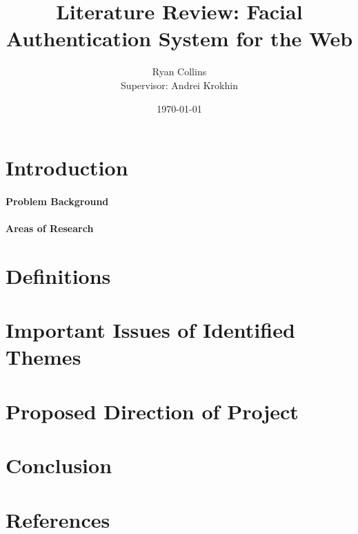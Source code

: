 \documentclass[14pt]{article}
\title{Literature Review: Facial Authentication System for the Web}
\author{
        Ryan Collins\\
        Supervisor: Andrei Krokhin
}
\date{\today}
\begin{document}
\maketitle


\section{Introduction}
\paragraph{Problem Background}


\paragraph{Areas of Research}


\section{Definitions}


\section{Important Issues of Identified Themes}

\section{Proposed Direction of Project}

\section{Conclusion}
\section{References}\label{references}
\printbibliography
\end{document}

